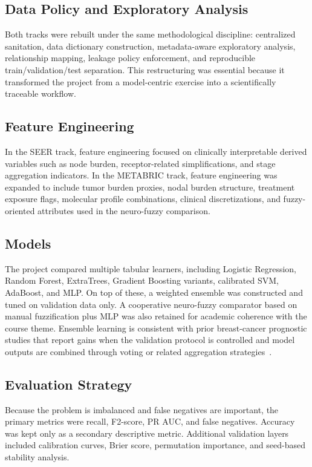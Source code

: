 \documentclass[conference]{IEEEtran}
\begin{document}
\subsection{Data Policy and Exploratory Analysis}

Both tracks were rebuilt under the same methodological discipline: centralized sanitation, data dictionary construction, metadata-aware exploratory analysis, relationship mapping, leakage policy enforcement, and reproducible train/validation/test separation. This restructuring was essential because it transformed the project from a model-centric exercise into a scientifically traceable workflow.

\subsection{Feature Engineering}

In the SEER track, feature engineering focused on clinically interpretable derived variables such as node burden, receptor-related simplifications, and stage aggregation indicators. In the METABRIC track, feature engineering was expanded to include tumor burden proxies, nodal burden structure, treatment exposure flags, molecular profile combinations, clinical discretizations, and fuzzy-oriented attributes used in the neuro-fuzzy comparison.

\subsection{Models}

The project compared multiple tabular learners, including Logistic Regression, Random Forest, ExtraTrees, Gradient Boosting variants, calibrated SVM, AdaBoost, and MLP. On top of these, a weighted ensemble was constructed and tuned on validation data only. A cooperative neuro-fuzzy comparator based on manual fuzzification plus MLP was also retained for academic coherence with the course theme. Ensemble learning is consistent with prior breast-cancer prognostic studies that report gains when the validation protocol is controlled and model outputs are combined through voting or related aggregation strategies~\cite{massafra2022}.

\subsection{Evaluation Strategy}

Because the problem is imbalanced and false negatives are important, the primary metrics were recall, F2-score, PR AUC, and false negatives. Accuracy was kept only as a secondary descriptive metric. Additional validation layers included calibration curves, Brier score, permutation importance, and seed-based stability analysis.
\end{document}
